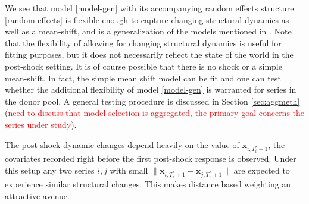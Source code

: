 \documentclass[11pt]{article}
\def\mbf#1{\mathbf{#1}} %
\theoremstyle{definition}
\begin{document}
We see that model \eqref{model-gen} with its accompanying random effects structure \eqref{random-effects} is flexible enough to capture changing structural dynamics as well as a mean-shift, and is a generalization of the models mentioned in \cite{lin2021minimizing}. Note that the flexibility of allowing for changing structural dynamics is useful for fitting purposes, but it does not necessarily reflect the state of the world in the post-shock setting. It is of course possible that there is no shock or a simple mean-shift. In fact, the simple mean shift model can be fit and one can test whether the additional flexibility of model \eqref{model-gen} is warranted for series in the donor pool. A general testing procedure is discussed in Section \ref{sec:aggmeth} (\textcolor{red}{need to discuss that model selection is aggregated, the primary goal concerns the series under study}).

The post-shock dynamic changes depend heavily on the value of $\mbf{x}_{i,T_i^*+1}$, the covariates recorded right before the first post-shock response is observed. Under this setup any two series $i,j$ with small $\|\mbf{x}_{i,T_i^*+1} - \mbf{x}_{j,T_i^*+1}\|$ are expected to experience similar structural changes. This makes distance based weighting an attractive avenue.
\end{document}
